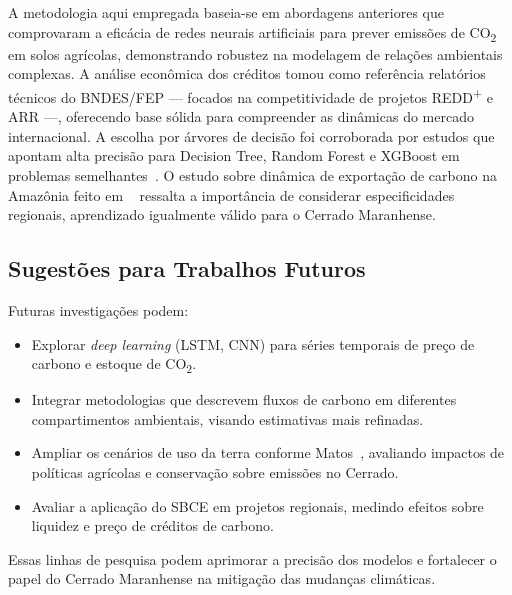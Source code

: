 \documentclass[conference]{IEEEtran}
\begin{document}
A metodologia aqui empregada baseia-se em abordagens anteriores que comprovaram a eficácia de redes neurais artificiais para prever emissões de CO\textsubscript{2} em solos agrícolas, demonstrando robustez na modelagem de relações ambientais complexas.  
A análise econômica dos créditos tomou como referência relatórios técnicos do BNDES/FEP — focados na competitividade de projetos REDD\textsuperscript{+} e ARR —, oferecendo base sólida para compreender as dinâmicas do mercado internacional.  
A escolha por árvores de decisão foi corroborada por estudos que apontam alta precisão para Decision Tree, Random Forest e XGBoost em problemas semelhantes~\cite{kanda2023,cutler2007}.  
O estudo sobre dinâmica de exportação de carbono na Amazônia feito em ~\cite{beloto2024} ressalta a importância de considerar especificidades regionais, aprendizado igualmente válido para o Cerrado Maranhense.

\subsection{Sugestões para Trabalhos Futuros}

Futuras investigações podem:

\begin{itemize}
  \item Explorar \emph{deep learning} (LSTM, CNN) para séries temporais de preço de carbono e estoque de CO\textsubscript{2}.  
  \item Integrar metodologias que descrevem fluxos de carbono em diferentes compartimentos ambientais, visando estimativas mais refinadas.  
  \item Ampliar os cenários de uso da terra conforme Matos~\cite{matos2020}, avaliando impactos de políticas agrícolas e conservação sobre emissões no Cerrado.  
  \item Avaliar a aplicação do SBCE em projetos regionais, medindo efeitos sobre liquidez e preço de créditos de carbono.  
\end{itemize}

Essas linhas de pesquisa podem aprimorar a precisão dos modelos e fortalecer o papel do Cerrado Maranhense na mitigação das mudanças climáticas.




\end{document}
